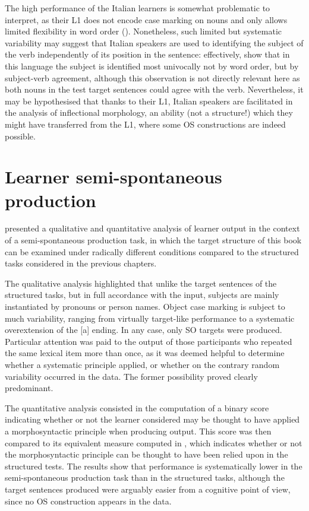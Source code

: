 The high performance of the Italian learners is somewhat problematic to interpret, as their L1 does not encode case marking on nouns and only allows limited flexibility in word order (\citealt{Jezek2003, Jezek2011, Jezek2016}). Nonetheless, such limited but systematic variability may suggest that Italian speakers are used to identifying the subject of the verb independently of its position in the sentence: effectively, \citet{MacWhinneyEtAl1984} show that in this language the subject is identified most univocally not by word order, but by subject-verb agreement, although this observation is not directly relevant here as both nouns in the test target sentences could agree with the verb. Nevertheless, it may be hypothesised that thanks to their L1, Italian speakers are facilitated in the analysis of inflectional morphology, an ability (not a structure!) which they might have transferred from the L1, where some OS constructions are indeed possible.

\section{Learner semi-spontaneous production}\label{sec:08:5}

 presented a qualitative and quantitative analysis of learner output in the context of a semi-spontaneous production task, in which the target structure of this book can be examined under radically different conditions compared to the structured tasks considered in the previous chapters.

The qualitative analysis highlighted that unlike the target sentences of the structured tasks, but in full accordance with the input, subjects are mainly instantiated by pronouns or person names.  Object case marking is subject to much variability, ranging from virtually target-like performance to a systematic overextension of the [a] ending. In any case, only SO targets were produced. Particular attention was paid to the output of those participants who repeated the same lexical item more than once, as it was deemed helpful to determine whether a systematic principle applied, or whether on the contrary random variability occurred in the data. The former possibility proved clearly predominant.

The quantitative analysis consisted in the computation of a binary score indicating whether or not the learner considered may be thought to have applied a morphosyntactic principle when producing output. This score was then compared to its equivalent measure computed in , which indicates whether or not the morphosyntactic principle can be thought to have been relied upon in the structured tests. The results show that performance is systematically lower in the semi-spontaneous production task than in the structured tasks, although the target sentences produced were arguably easier from a cognitive point of view, since no OS construction appears in the data.

